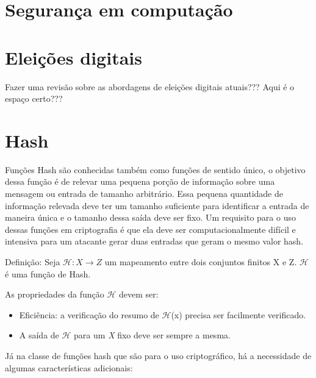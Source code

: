 \documentclass{ufsctex/ufsctex}
\begin{document}
\section{Segurança em computação}



\section{Eleições digitais}

Fazer uma revisão sobre as abordagens de eleições digitais atuais??? Aqui é o
espaço certo???

\section{Hash}

Funções Hash são conhecidas também como funções de sentido único, o objetivo
dessa função é de relevar uma pequena porção de informação sobre uma mensagem
ou entrada de tamanho arbitrário.  Essa pequena quantidade de informação
relevada deve ter um tamanho suficiente para identificar a entrada de maneira
única e o tamanho dessa saída deve ser fixo. Um requisito para o uso dessas
funções em criptografia é que ela deve ser computacionalmente difícil e
intensiva para um atacante gerar duas entradas que geram o mesmo valor hash.
\cite{cryptoschool}

Definição: Seja $\mathcal{H} : X \longrightarrow Z$ um mapeamento entre dois
conjuntos finitos X e Z. $\mathcal{H}$  é uma função de Hash.

As propriedades da função $\mathcal{H}$ devem ser:

\begin{itemize}

	\item Eficiência: a verificação do resumo de $\mathcal{H}$(x) precisa ser
	facilmente verificado.
	\item A saída de $\mathcal{H}$ para um \textit{X} fixo deve ser sempre a
		mesma.

\end{itemize}

Já na classe de funções hash que são para o uso criptográfico, há a necessidade
de algumas características adicionais:
\end{document}
